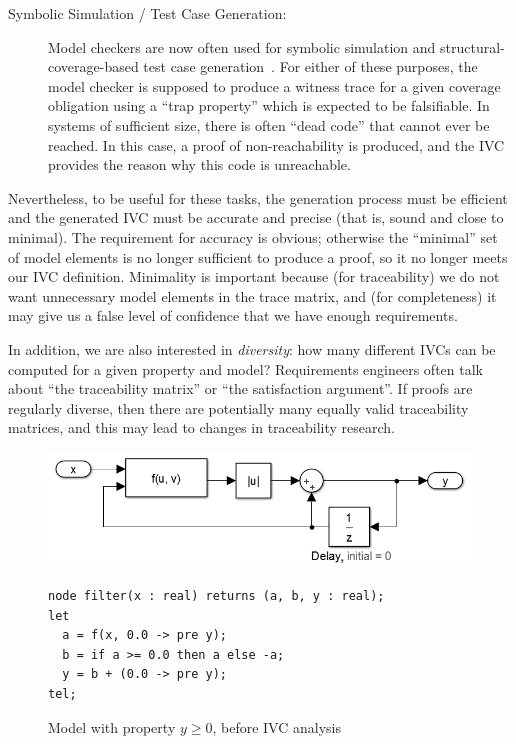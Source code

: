 \begin{description}
    \item[Symbolic Simulation / Test Case Generation:]  Model checkers are now often used for symbolic simulation and structural-coverage-based test case generation~\cite{SimulinkDesignVerifier,Whalen13:OMCDC}.  For either of these purposes, the model checker is supposed to produce a witness trace for a given coverage obligation using a ``trap property'' which is expected to be falsifiable.  In systems of sufficient size, there is often ``dead code'' that cannot ever be reached.  In this case, a proof of non-reachability is produced, and the IVC provides the reason why this code is unreachable.
\end{description}
\noindent Nevertheless, to be useful for these tasks, the generation
process must be efficient and the generated IVC must be
accurate and precise (that is, sound and close to minimal).  The requirement for accuracy is obvious; otherwise the ``minimal'' set of model elements is no longer sufficient to produce a proof, so it no longer meets our IVC definition.  Minimality is important because (for traceability) we do not want unnecessary model elements in the trace matrix, and (for completeness) it may give us a false level of confidence that we have enough requirements.

 In addition,  we are also interested in {\em diversity}:  how many different IVCs can be computed for a given property and model? Requirements engineers often talk about ``the traceability matrix'' or ``the satisfaction argument''.  If proofs are regularly diverse, then there are potentially many equally valid traceability matrices, and this may lead to changes in traceability research.

\begin{figure}[t]
\centering
\includegraphics[width=\columnwidth]{figs/simulink.png}
{\smaller
\begin{verbatim}
node filter(x : real) returns (a, b, y : real);
let
  a = f(x, 0.0 -> pre y);
  b = if a >= 0.0 then a else -a;
  y = b + (0.0 -> pre y);
tel;
\end{verbatim}
}
\caption{Model with property $y \geq 0$, before IVC analysis}
\label{fig:ex-before}
\end{figure}

